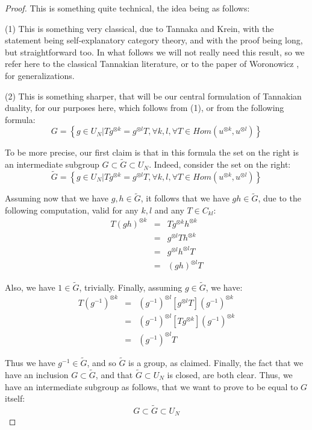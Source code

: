 \documentclass[12pt]{amsbook}
\begin{document}
\begin{proof}
This is something quite technical, the idea being as follows:

\medskip

(1) This is something very classical, due to Tannaka and Krein, with the statement being self-explanatory category theory, and with the proof being long, but straightforward too. In what follows we will not really need this result, so we refer here to the classical Tannakian literature, or to the paper of Woronowicz \cite{wo2}, for generalizations.

\medskip

(2) This is something sharper, that will be our central formulation of Tannakian duality, for our purposes here, which follows from (1), or from the following formula:
$$G=\left\{g\in U_N\Big| Tg^{\otimes k}=g^{\otimes l}T,\forall k,l,\forall T\in Hom(u^{\otimes k},u^{\otimes l})\right\}$$

To be more precise, our first claim is that in this formula the set on the right is an intermediate subgroup $G\subset\widetilde{G}\subset U_N$. Indeed, consider the set on the right:
$$\widetilde{G}=\left\{g\in U_N\Big| Tg^{\otimes k}=g^{\otimes l}T,\forall k,l,\forall T\in Hom(u^{\otimes k},u^{\otimes l})\right\}$$

Assuming now that we have $g,h\in\widetilde{G}$, it follows that we have $gh\in\widetilde{G}$, due to the following computation, valid for any $k,l$ and any $T\in C_{kl}$:
\begin{eqnarray*}
T(gh)^{\otimes k}
&=&Tg^{\otimes k}h^{\otimes k}\\
&=&g^{\otimes l}Th^{\otimes k}\\
&=&g^{\otimes l}h^{\otimes l}T\\
&=&(gh)^{\otimes l}T
\end{eqnarray*}

Also, we have $1\in\widetilde{G}$, trivially. Finally, assuming $g\in\widetilde{G}$, we have:
\begin{eqnarray*}
T(g^{-1})^{\otimes k}
&=&(g^{-1})^{\otimes l}[g^{\otimes l}T](g^{-1})^{\otimes k}\\
&=&(g^{-1})^{\otimes l}[Tg^{\otimes k}](g^{-1})^{\otimes k}\\
&=&(g^{-1})^{\otimes l}T
\end{eqnarray*}

Thus we have $g^{-1}\in\widetilde{G}$, and so $\widetilde{G}$ is a group, as claimed. Finally, the fact that we have an inclusion $G\subset\widetilde{G}$, and that $\widetilde{G}\subset U_N$ is closed, are both clear. Thus, we have an intermediate subgroup as follows, that we want to prove to be equal to $G$ itself:
$$G\subset\widetilde{G}\subset U_N$$


\end{proof}
\end{document}
